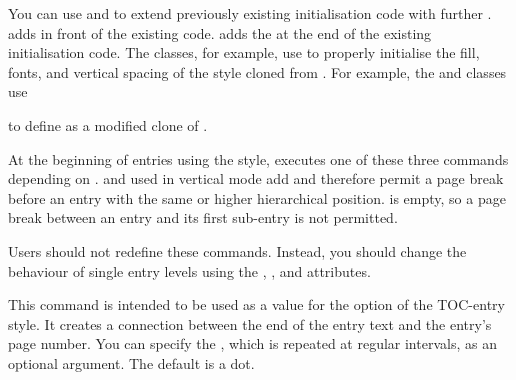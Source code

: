 You can use  and
 to extend previously existing initialisation
code with further . 
adds  in front of the existing code.
 adds the  at the end of the
existing initialisation code. The \KOMAScript{} classes, for example, use
 to properly initialise the fill, fonts, and
vertical spacing of the  style cloned from . For
example, the  and  classes use
\begin{lstcode}
  \TOCEntryStyleStartInitCode{section}{%
    \expandafter\providecommand%
    \csname scr@tso@#1@linefill\endcsname
    {\TOCLineLeaderFill\relax}%
  }
\end{lstcode}
to define  as a modified clone of .%
\EndIndexGroup


\begin{Declaration}
\end{Declaration}
At the beginning of entries
using the  style,  executes one of these
three commands depending on . 
and  used in vertical mode add
 and therefore permit a page
break before an entry with the same or higher hierarchical position.
 is empty, so a page break between an entry and
its first sub-entry is not permitted.

Users should not redefine these commands. Instead, you should change the
behaviour of single entry levels using the ,
, and  attributes.%
\EndIndexGroup


\begin{Declaration}
\end{Declaration}
This command is intended to be
used as a value for the  option of the 
TOC-entry style. It creates a connection between the end of the entry text and
the entry's page number. You can specify the , which is repeated
at regular intervals, as an optional argument. The default is a dot.

